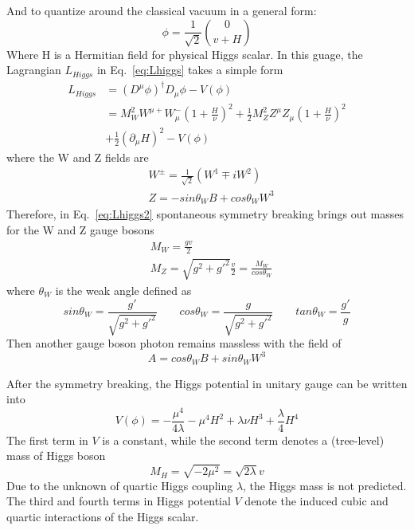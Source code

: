 And to quantize around the classical vacuum in a general form:
\begin{equation}
	\phi = \frac{1}{\sqrt{2}} \binom{0}{v+H}
\end{equation}
Where H is a Hermitian field for physical Higgs scalar.
In this guage, the Lagrangian $L_{Higgs}$ in Eq.~\ref{eq:Lhiggs} takes a simple form
\begin{equation}
\begin{split} \label{eq:Lhiggs2}
	L_{Higgs} & = \left(D^{\mu}\phi\right)^{\dagger}D_{\mu}\phi - V(\phi) \\
	& = M_{W}^{2}W^{\mu+}W_{\mu}^{-}\left(1+\frac{H}{\nu}\right)^{2} + \frac{1}{2}M_{Z}^{2}Z^{\mu}Z_{\mu}\left(1+\frac{H}{\nu}\right)^{2} \\ 
        &   + \frac{1}{2}\left(\partial_{\mu}H\right)^{2} - V(\phi)
\end{split}
\end{equation}
where the W and Z fields are
\begin{equation}
\begin{split}
	& W^{\pm} = \frac{1}{\sqrt{2}} \left(W^{1} \mp iW^{2}\right) \\
	& Z = - sin\theta_{W}B + cos\theta_{W}W^{3}
\end{split}
\end{equation}
Therefore, in Eq.~\ref{eq:Lhiggs2} spontaneous symmetry breaking brings out masses for the W and Z gauge bosons
\begin{equation}
\begin{split}
	& M_{W} = \frac{gv}{2} \\
	& M_{Z} = \sqrt{g^{2} + g'^{2}} \frac{v}{2} = \frac{M_{W}}{cos\theta_{W}}
\end{split}
\end{equation}
where $\theta_{W}$ is the weak angle defined as
\begin{equation}
	sin\theta_{W} = \frac{g'}{\sqrt{g^{2} + g'^{2}}} \qquad cos\theta_{W} = \frac{g}{\sqrt{g^{2} + g'^{2}}} \qquad tan\theta_{W} = \frac{g'}{g}
\end{equation}
Then another gauge boson photon remains massless with the field of
\begin{equation}
	A = cos\theta_{W}B + sin\theta_{W}W^{3}
\end{equation}

After the symmetry breaking, the Higgs potential in unitary gauge can be written into
\begin{equation}
	V(\phi) = -\frac{\mu^{4}}{4\lambda} - \mu^{4}H^{2} + \lambda\nu H^{3} + \frac{\lambda}{4}H^{4}
\end{equation}
The first term in $V$ is a constant, while the second term denotes a (tree-level) mass of Higgs boson
\begin{equation}
	M_{H} = \sqrt{-2\mu^{2}} = \sqrt{2\lambda}v
\end{equation}
Due to the unknown of quartic Higgs coupling $\lambda$, the Higgs mass is not predicted.
The third and fourth terms in Higgs potential $V$ denote the induced cubic and quartic interactions of the Higgs scalar.

